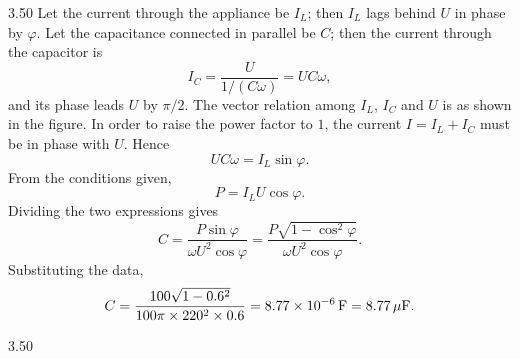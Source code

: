 \begin{solution}{3.50}
Let the current through the appliance be $I_L$; then $I_L$ lags behind $U$ in phase by $\varphi$. Let the capacitance connected in parallel be $C$; then the current through the capacitor is
\[
I_C=\frac{U}{1/(C\omega)}=UC\omega,
\]
and its phase leads $U$ by $\pi/2$. The vector relation among $I_L$, $I_C$ and $U$ is as shown in the figure. In order to raise the power factor to $1$, the current $I=I_L+I_C$ must be in phase with $U$. Hence
\[
UC\omega=I_L\sin\varphi.
\]
From the conditions given,
\[
P=I_LU\cos\varphi.
\]
Dividing the two expressions gives
\[
C=\frac{P\sin\varphi}{\omega U^2\cos\varphi}
=\frac{P\sqrt{1-\cos^2\varphi}}{\omega U^2\cos\varphi}.
\]
Substituting the data,
\[
C=\frac{100\sqrt{1-0.6^2}}{100\pi\times220^2\times0.6}
=8.77\times10^{-6}\,\mathrm{F}=8.77\,\mu\mathrm{F}.
\]

\begin{figbox}{3.50}
\end{figbox}
\end{solution}

